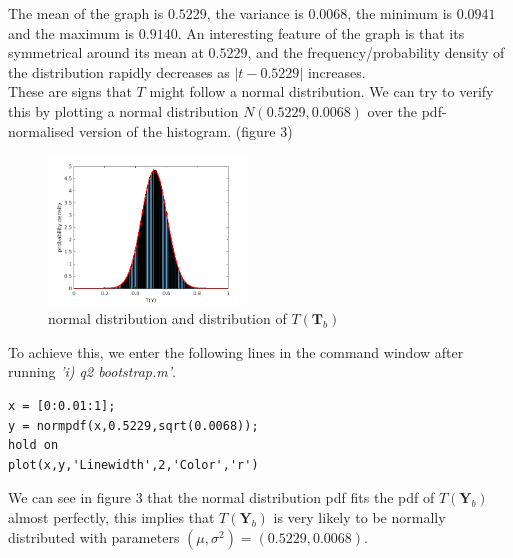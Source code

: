 \documentclass[10pt]{article}
\begin{document}
The mean of the graph is $0.5229$, the variance is $0.0068$, the minimum is $0.0941$ and the maximum is $0.9140$. An interesting feature of the graph is that its symmetrical around its mean at $0.5229$, and the frequency/probability density of the distribution rapidly decreases as $|t-0.5229|$ increases.\\
These are signs that $T$ might follow a normal distribution. We can try to verify this by plotting a normal distribution $N(0.5229, 0.0068)$ over the pdf-normalised version of the histogram. (figure 3)\\
\begin{figure}[H]
\centering
\includegraphics[width=0.47\textwidth]{files/q2_normal.png}
\caption{normal distribution and distribution of $T(\mathbf{T}_b)$}
\end{figure}
\noindent To achieve this, we enter the following lines in the command window after running \emph{'i) q2 \textunderscore bootstrap.m'}.
\begin{lstlisting}
x = [0:0.01:1];
y = normpdf(x,0.5229,sqrt(0.0068)); 
hold on
plot(x,y,'Linewidth',2,'Color','r')
\end{lstlisting}
We can see in figure 3 that the normal distribution pdf fits the pdf of $T(\mathbf{Y}_b)$ almost perfectly, this implies that $T(\mathbf{Y}_b)$ is very likely to be normally distributed with parameters $(\mu,\sigma^2)=(0.5229,0.0068)$.
\end{document}
